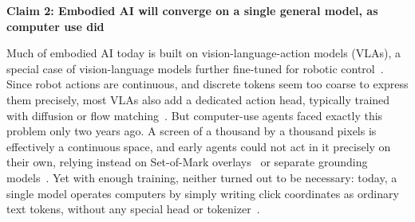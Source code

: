 \documentclass{article}
\begin{document}
\textbf{Claim 2: Embodied AI will converge on a single general model, as computer use did}

Much of embodied AI today is built on vision-language-action models (VLAs), a special case of vision-language models further fine-tuned for robotic control~\citep{brohan2023rt2,kim2024openvla,black2025pi0,kawaharazuka2025vlareview}. Since robot actions are continuous, and discrete tokens seem too coarse to express them precisely, most VLAs also add a dedicated action head, typically trained with diffusion or flow matching~\citep{black2025pi0,nvidia2025gr00t,li2024cogact,kawaharazuka2025vlareview}. But computer-use agents faced exactly this problem only two years ago. A screen of a thousand by a thousand pixels is effectively a continuous space, and early agents could not act in it precisely on their own, relying instead on Set-of-Mark overlays~\citep{yang2023som,xie2024osworld} or separate grounding models~\citep{gou2025uground}. Yet with enough training, neither turned out to be necessary: today, a single model operates computers by simply writing click coordinates as ordinary text tokens, without any special head or tokenizer~\citep{cheng2024seeclick,qin2025uitars,bai2025qwen25vl}.
\end{document}
